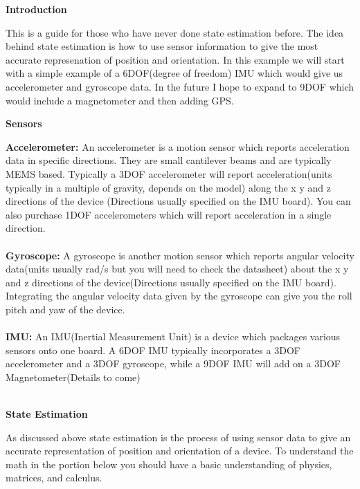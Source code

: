 \documentclass[12pt,letterpaper,boxed]{hmcpset}
\begin{document}
\begin{center}
\textbf{Introduction}
\end{center}
This is a guide for those who have never done state estimation before. The idea behind state estimation is how to use sensor information to give the most accurate represenation of position and orientation. In this example we will start with a simple example of a 6DOF(degree of freedom) IMU which would give us accelerometer and gyroscope data. In the future I hope to expand to 9DOF which would include a magnetometer and then adding GPS.
\begin{center}
\textbf{Sensors}
\end{center}
\textbf{Accelerometer:} An accelerometer is a motion sensor which reports acceleration data in specific directions. They are small cantilever beams and are typically MEMS based. Typically a 3DOF accelerometer will report acceleration(units typically in a multiple of gravity, depends on the model) along the x y and z directions of the device (Directions usually specified on the IMU board). You can also purchase 1DOF accelerometers which will report acceleration in a single direction.\\\\
\textbf{Gyroscope:} A gyroscope is another motion sensor which reports angular velocity data(units usually rad/s but you will need to check the datasheet) about the x y and z directions of the device(Directions usually specified on the IMU board). Integrating the angular velocity data given by the gyroscope can give you the roll pitch and yaw of the device.\\\\
\textbf{IMU:} An IMU(Inertial Measurement Unit) is a device which packages various sensors onto one board. A 6DOF IMU typically incorporates a 3DOF accelerometer and a 3DOF gyroscope, while a 9DOF IMU will add on a 3DOF Magnetometer(Details to come)\\\\
\begin{center}
\textbf{State Estimation}
\end{center}
As discussed above state estimation is the process of using sensor data to give an accurate representation of position and orientation of a device. To understand the math in the portion below you should have a basic understanding of physics, matrices, and calculus.\\
\end{document}
